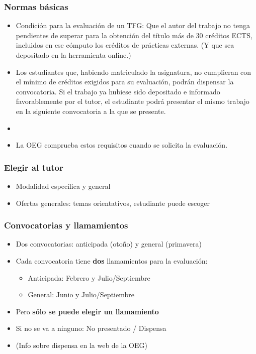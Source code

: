 \documentclass[aspectratio=43]{beamer}
\begin{document}
\begin{frame}
\frametitle{Normas básicas}
\centering


\begin{itemize}
  \item Condición para la evaluación de un TFG: Que el autor del trabajo no tenga pendientes de superar para la obtención del título más de 30 créditos ECTS, incluidos en ese cómputo los créditos de prácticas externas. (Y que sea depositado en la herramienta online.)
  \item Los estudiantes que, habiendo matriculado la asignatura, no cumplieran con el mínimo de créditos exigidos para su evaluación, podrán dispensar la convocatoria. Si el trabajo ya hubiese sido depositado e informado favorablemente por el tutor, el estudiante podrá presentar el mismo trabajo en la siguiente convocatoria a la que se presente.
  \item[]
  \item La OEG comprueba estos requisitos cuando se solicita la evaluación.
\end{itemize}


\end{frame}

\begin{frame}
\frametitle{Elegir al \textbf{tutor}}
\centering

\begin{itemize}
  \item Modalidad específica y general
  \item Ofertas generales: temas orientativos, estudiante puede escoger
\end{itemize}

\end{frame}
  

\begin{frame}
\frametitle{Convocatorias y llamamientos}
\centering

\begin{itemize}
  \item Dos convocatorias: anticipada (otoño) y general (primavera)
  \item Cada convocatoria tiene \textbf{dos} llamamientos para la evaluación:
  \begin{itemize}
    \item Anticipada: Febrero y Julio/Septiembre
    \item General: Junio y Julio/Septiembre
  \end{itemize}
  \item Pero \textbf{sólo se puede elegir un llamamiento}
  \item Si no se va a ninguno: No presentado / Dispensa
  \item[] (Info sobre dispensa en la web de la OEG)
\end{itemize}

\end{frame}
\end{document}
